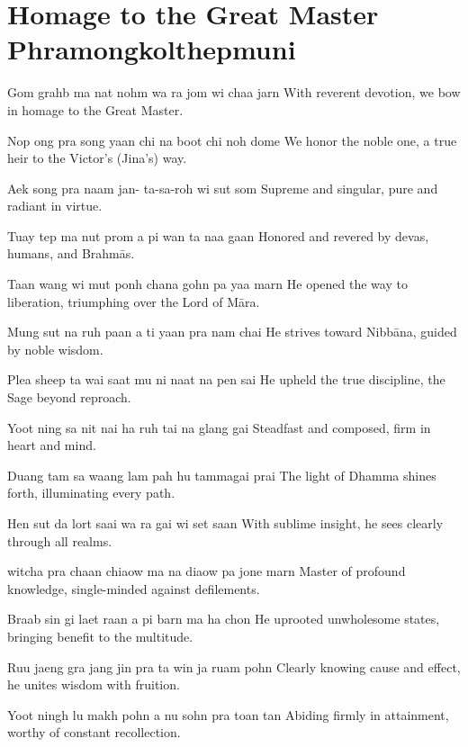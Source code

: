 \section*{Homage to the Great Master Phramongkolthepmuni}

\begin{chantsubsection}

\chantlinepair
{Gom grahb ma nat nohm}
{wa ra jom wi chaa jarn}
{With reverent devotion, we bow in homage to the Great Master.}

\chantlinepair
{Nop ong pra song yaan}
{chi na boot chi noh dome}
{We honor the noble one, a true heir to the Victor's (Jina's) way.}

\chantlinepair
{Aek song pra naam jan-}
{ta-sa-roh wi sut som}
{Supreme and singular, pure and radiant in virtue.}

\chantlinepair
{Tuay tep ma nut prom}
{a pi wan ta naa gaan}
{Honored and revered by devas, humans, and Brahmās.}

\chantlinepair
{Taan wang wi mut ponh}
{chana gohn pa yaa marn}
{He opened the way to liberation, triumphing over the Lord of Māra.}

\chantlinepair
{Mung sut na ruh paan}
{a ti yaan pra nam chai}
{He strives toward Nibbāna, guided by noble wisdom.}

\chantlinepair
{Plea sheep ta wai saat}
{mu ni naat na pen sai}
{He upheld the true discipline, the Sage beyond reproach.}

\chantlinepair
{Yoot ning sa nit nai}
{ha ruh tai na glang gai}
{Steadfast and composed, firm in heart and mind.}

\chantlinepair
{Duang tam sa waang lam}
{pah hu tammagai prai}
{The light of Dhamma shines forth, illuminating every path.}

\chantlinepair
{Hen sut da lort saai}
{wa ra gai wi set saan}
{With sublime insight, he sees clearly through all realms.}

\chantlinepair
{witcha pra chaan chiaow}
{ma na diaow pa jone marn}
{Master of profound knowledge, single-minded against defilements.}

\chantlinepair
{Braab sin gi laet raan}
{a pi barn ma ha chon}
{He uprooted unwholesome states, bringing benefit to the multitude.}

\chantlinepair
{Ruu jaeng gra jang jin}
{pra ta win ja ruam pohn}
{Clearly knowing cause and effect, he unites wisdom with fruition.}

\chantlinepair
{Yoot ningh lu makh pohn}
{a nu sohn pra toan tan}
{Abiding firmly in attainment, worthy of constant recollection.}


\end{chantsubsection}
